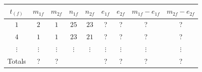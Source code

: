 \documentclass[12pt]{article}
\begin{document}
\begin{enumerate}
	\begin{center}
\begin{tabular}{ c | c c | c c | c c | c c }

 $t_{(f)}$ & $m_{1f}$ & $m_{2f}$ & $n_{1f}$ & $n_{2f}$   & $e_{1f}$ & $e_{2f}$ & $m_{1f} - e_{1f}$ & $m_{2f} - e_{2f}$ \\

 \hline

 $1$ & $2$ & $1$ & $25$ & $23$    & ? & ? & ? & ? \\

 $4$ & $1$ & $1$ & $23$ & $21$    & ? & ? & ? & ? \\

 $\vdots$ & $\vdots$ & $\vdots$ & $\vdots$ & $\vdots$    & $\vdots$ & $\vdots$ & $\vdots$ & $\vdots$ \\

 \hline

 Totals & ? & ? & &    & ? & ? & ? & ?
\end{tabular}
\end{center}

\end{enumerate}
\end{document}
